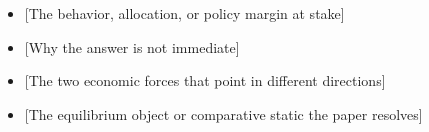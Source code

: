 \documentclass[11pt, aspectratio=169]{beamer}
\title[\PaperShortTitle]{\PaperTitle}
\author[\AuthorShort]{\TitleAuthorBlock}
\institute{\TitleAffiliationBlock}
\date[\VenueShort]{\VenueDate}
\begin{document}
\begin{frame}[plain]
  \titlepage
\end{frame}
\addtocounter{framenumber}{-1}

\begin{frame}[t]{\KeyQuestion}
  \medskip
  \begin{itemize}\setlength{\itemsep}{0.55em}
    \item {[The behavior, allocation, or policy margin at stake]}
    \item {[Why the answer is not immediate]}
  \end{itemize}

  \medskip
  \begin{itemize}\setlength{\itemsep}{0.55em}
    \item {[The two economic forces that point in different directions]}
    \item {[The equilibrium object or comparative static the paper resolves]}
  \end{itemize}
  \medskip
\end{frame}
\end{document}
